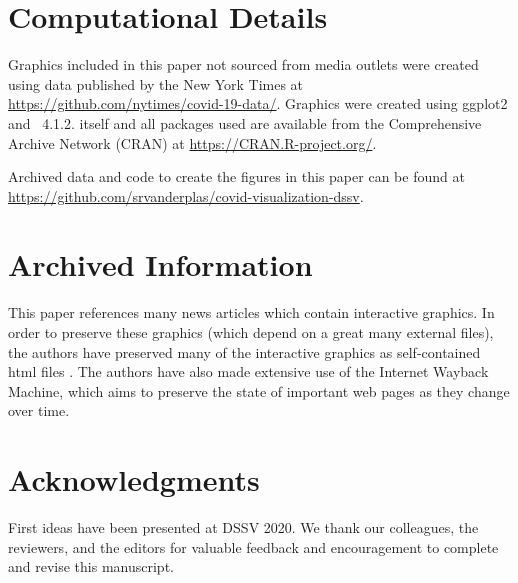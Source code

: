 \documentclass[article]{jdssv}\usepackage[]{graphicx}\usepackage[]{xcolor}
\begin{document}
\newpage
\section*{Computational Details}
Graphics included in this paper not sourced from media outlets were created using data published by the New York Times at \url{https://github.com/nytimes/covid-19-data/}. Graphics were created using ggplot2\citep{ggplot2} and ~4.1.2.  itself and all packages used are available from the Comprehensive  Archive Network (CRAN) at \url{https://CRAN.R-project.org/}.

Archived data and code to create the figures in this paper can be found at \url{https://github.com/srvanderplas/covid-visualization-dssv}.

\section*{Archived Information}
This paper references many news articles which contain interactive graphics. In order to preserve these graphics (which depend on a great many external files), the authors have preserved many of the interactive graphics as self-contained html files \citep{news-file-archive}. 
The authors have also made extensive use of the Internet Wayback Machine, which aims to preserve the state of important web pages as they change over time.

\section*{Acknowledgments}

First ideas have been presented at DSSV 2020. We thank our colleagues, the reviewers, and the editors for valuable feedback and encouragement to complete and revise this manuscript.





% 
% 
% 
% 
% 
\end{document}

